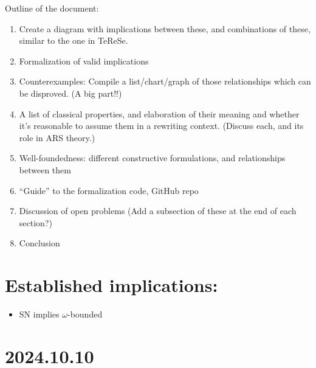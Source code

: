 \documentclass{scrartcl}
\begin{document}
Outline of the document:
\begin{enumerate}
  \item Create a diagram with implications between these, and
  combinations of these, similar to the one in TeReSe.
  \item Formalization of valid implications
  \item Counterexamples: Compile a list/chart/graph of those relationships
  which can be disproved. (A big part!!)
  \item A list of classical properties, and elaboration of their meaning
  and whether it's reasonable to assume them in a rewriting context.
  (Discuss each, and its role in ARS theory.)
  \item Well-foundedness: different constructive formulations, and relationships between them
  \item ``Guide'' to the formalization code, GitHub repo
  \item Discussion of open problems (Add a subsection of these at the end of each section?)
  \item Conclusion
\end{enumerate}

\section{Established implications:}

\begin{itemize}
  \item SN implies $\omega$-bounded
\end{itemize}

\section{2024.10.10}
\end{document}

